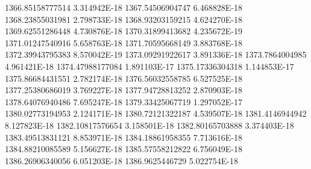 1366.85158777514  3.314942E-18
1367.54506904747  6.468828E-18
1368.23855031981  2.798733E-18
1368.93203159215  4.624270E-18
1369.62551286448  4.730876E-18
1370.31899413682  4.235672E-19
1371.01247540916  5.658763E-18
1371.70595668149  3.883768E-18
1372.39943795383  8.570042E-19
1373.09291922617  3.891336E-18
1373.7864004985  4.961421E-18
1374.47988177084  1.891103E-17
1375.17336304318  1.144853E-17
1375.86684431551  2.782174E-18
1376.56032558785  6.527525E-18
1377.25380686019  3.769227E-18
1377.94728813252  2.870903E-18
1378.64076940486  7.695247E-18
1379.33425067719  1.297052E-17
1380.02773194953  2.124171E-18
1380.72121322187  4.539507E-18
1381.4146944942  8.127823E-18
1382.10817576654  3.158501E-18
1382.80165703888  3.374403E-18
1383.49513831121  8.853971E-18
1384.18861958355  7.713616E-18
1384.88210085589  5.156627E-18
1385.57558212822  6.756049E-18
1386.26906340056  6.051203E-18
1386.9625446729  5.022754E-18
